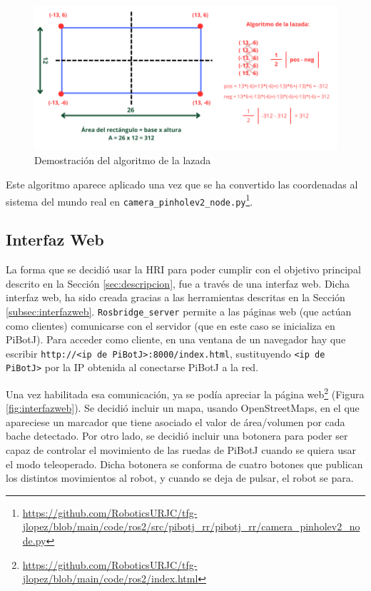  \begin{figure} [h!]
	\begin{center}
		\includegraphics[width=15cm]{figs/cap6/demoshoelace.png}
	\end{center}
	\caption{Demostración del algoritmo de la lazada}
	\label{fig:demoshoelace}
\end{figure}


Este algoritmo aparece aplicado una vez que se ha convertido las coordenadas al sistema del mundo real en \verb|camera_pinholev2_node.py|\footnote{\url{https://github.com/RoboticsURJC/tfg-jlopez/blob/main/code/ros2/src/pibotj_rr/pibotj_rr/camera_pinholev2_node.py}}.


\subsection{Interfaz Web}
\label{subsec:softwareweb}
La forma que se decidió usar la \ac{HRI} para poder cumplir con el objetivo principal descrito en la Sección \ref{sec:descripcion}, fue a través de una interfaz web. Dicha interfaz web, ha sido creada gracias a las herramientas descritas en la Sección \ref{subsec:interfazweb}. \verb|Rosbridge_server| permite a las páginas web (que actúan como clientes) comunicarse con el servidor (que en este caso se inicializa en PiBotJ). Para acceder como cliente, en una ventana de un navegador hay que escribir \verb|http://<ip de PiBotJ>:8000/index.html|, sustituyendo \verb|<ip de PiBotJ>| por la IP obtenida al conectarse PiBotJ a la red.
 
Una vez habilitada esa comunicación, ya se podía apreciar la página web\footnote{\url{https://github.com/RoboticsURJC/tfg-jlopez/blob/main/code/ros2/index.html}} (Figura \ref{fig:interfazweb}). Se decidió incluir un mapa, usando OpenStreetMaps, en el que apareciese un marcador que tiene asociado el valor de área/volumen por cada bache detectado. Por otro lado, se decidió incluir una botonera para poder ser capaz de controlar el movimiento de las ruedas de PiBotJ cuando se quiera usar el modo teleoperado. Dicha botonera se conforma de cuatro botones que publican los distintos movimientos al robot, y cuando se deja de pulsar, el robot se para.


